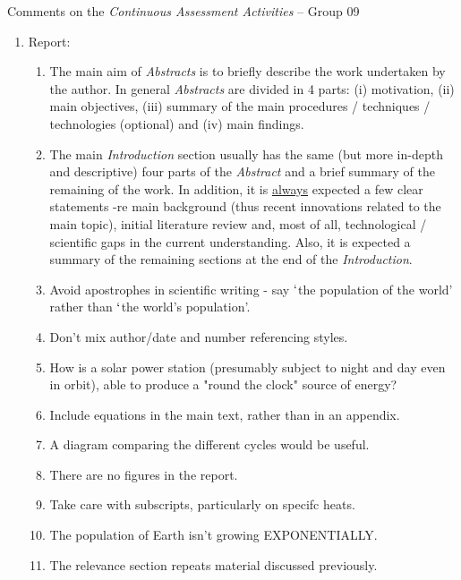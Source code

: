 \documentclass[14pt,twoside]{report}
\begin{document}
\clearpage


\bigskip

\begin{center}
  {\Large Comments on the {\it Continuous Assessment Activities} -- Group 09}
\end{center}

\begin{enumerate}

\item Report:
\begin{enumerate}
%
\item The main aim of {\it Abstracts} is to briefly describe the work undertaken by the author. In general {\it Abstracts} are divided in 4 parts: (i) motivation, (ii) main objectives, (iii) summary of the main procedures / techniques / technologies (optional) and (iv) main findings. 
%
\item The main {\it Introduction} section usually has the same (but more in-depth and descriptive) four parts of the {\it Abstract} and a brief summary of the remaining of the work. In addition, it is \underline{always} expected a few clear statements -re main background (thus recent innovations related to the main topic), initial literature review and, most of all, technological / scientific gaps in the current understanding. Also, it is expected a summary of the remaining sections at the end of the {\it Introduction}.
%
\item Avoid apostrophes in scientific writing - say $\lq$the population of the world' rather than $\lq$the world's population'.
%
\item Don't mix author/date and number referencing styles.
%
\item How is a solar power station (presumably subject to night and day even in orbit), able to produce a "round the clock" source of energy?
%
\item Include equations in the main text, rather than in an appendix.
%
\item A diagram comparing the different cycles would be useful.
%
\item There are no figures in the report.
%
\item Take care with subscripts, particularly on specifc heats.
%
\item The population of Earth isn't growing EXPONENTIALLY.
%
\item The relevance section repeats material discussed previously.

\end{enumerate}
\end{enumerate}
\end{document}
